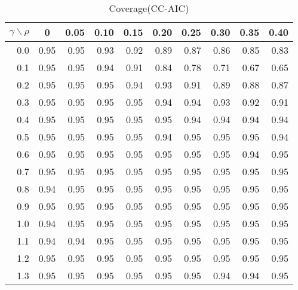 \documentclass[12pt]{article}
\begin{document}
%
\begin{table}[!tbp]
\caption{Coverage(CC-AIC)}
 \begin{center}
 \begin{tabular}{r|rrrrrrrrr}\hline\hline
\multicolumn{1}{c|}{$\gamma\backslash\rho$}&\multicolumn{1}{c}{0}&\multicolumn{1}{c}{0.05}&\multicolumn{1}{c}{0.10}&\multicolumn{1}{c}{0.15}&\multicolumn{1}{c}{0.20}&\multicolumn{1}{c}{0.25}&\multicolumn{1}{c}{0.30}&\multicolumn{1}{c}{0.35}&\multicolumn{1}{c}{0.40}\tabularnewline
\hline

0.0&0.95&0.95&0.93&0.92&0.89&0.87&0.86&0.85&0.83\tabularnewline
0.1&0.95&0.95&0.94&0.91&0.84&0.78&0.71&0.67&0.65\tabularnewline
0.2&0.95&0.95&0.95&0.94&0.93&0.91&0.89&0.88&0.87\tabularnewline
0.3&0.95&0.95&0.95&0.95&0.94&0.94&0.93&0.92&0.91\tabularnewline
0.4&0.95&0.95&0.95&0.95&0.95&0.94&0.94&0.94&0.94\tabularnewline
0.5&0.95&0.95&0.95&0.95&0.94&0.95&0.95&0.95&0.94\tabularnewline
0.6&0.95&0.95&0.95&0.95&0.95&0.95&0.95&0.94&0.95\tabularnewline
0.7&0.95&0.95&0.95&0.95&0.95&0.95&0.95&0.95&0.95\tabularnewline
0.8&0.94&0.95&0.95&0.95&0.95&0.95&0.95&0.95&0.95\tabularnewline
0.9&0.95&0.95&0.95&0.95&0.95&0.95&0.95&0.95&0.95\tabularnewline
1.0&0.94&0.95&0.95&0.95&0.95&0.95&0.95&0.95&0.95\tabularnewline
1.1&0.94&0.94&0.95&0.95&0.95&0.95&0.95&0.95&0.95\tabularnewline
1.2&0.95&0.95&0.95&0.95&0.95&0.95&0.95&0.95&0.95\tabularnewline
1.3&0.95&0.95&0.95&0.95&0.95&0.95&0.94&0.94&0.95\tabularnewline
\hline
\end{tabular}

\end{center}

\end{table}
\end{document}
